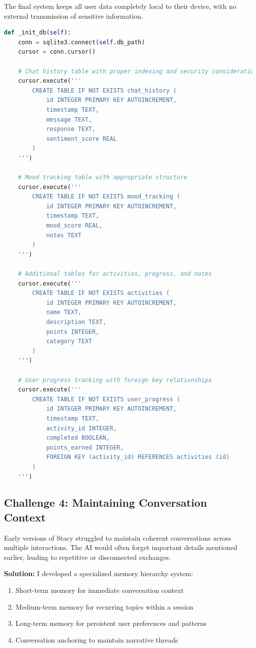 \documentclass[12pt]{article}
\begin{document}
The final system keeps all user data completely local to their device, with no external transmission of sensitive information.

\begin{lstlisting}[language=Python, caption=Secure Database Implementation]
def _init_db(self):
    conn = sqlite3.connect(self.db_path)
    cursor = conn.cursor()
    
    # Chat history table with proper indexing and security considerations
    cursor.execute('''
        CREATE TABLE IF NOT EXISTS chat_history (
            id INTEGER PRIMARY KEY AUTOINCREMENT,
            timestamp TEXT,
            message TEXT,
            response TEXT,
            sentiment_score REAL
        )
    ''')
    
    # Mood tracking table with appropriate structure
    cursor.execute('''
        CREATE TABLE IF NOT EXISTS mood_tracking (
            id INTEGER PRIMARY KEY AUTOINCREMENT,
            timestamp TEXT,
            mood_score REAL,
            notes TEXT
        )
    ''')
    
    # Additional tables for activities, progress, and notes
    cursor.execute('''
        CREATE TABLE IF NOT EXISTS activities (
            id INTEGER PRIMARY KEY AUTOINCREMENT,
            name TEXT,
            description TEXT,
            points INTEGER,
            category TEXT
        )
    ''')
    
    # User progress tracking with foreign key relationships
    cursor.execute('''
        CREATE TABLE IF NOT EXISTS user_progress (
            id INTEGER PRIMARY KEY AUTOINCREMENT,
            timestamp TEXT,
            activity_id INTEGER,
            completed BOOLEAN,
            points_earned INTEGER,
            FOREIGN KEY (activity_id) REFERENCES activities (id)
        )
    ''')
\end{lstlisting}

\subsection{Challenge 4: Maintaining Conversation Context}

Early versions of Stacy struggled to maintain coherent conversations across multiple interactions. The AI would often forget important details mentioned earlier, leading to repetitive or disconnected exchanges.

\textbf{Solution:} I developed a specialized memory hierarchy system:

\begin{enumerate}
    \item Short-term memory for immediate conversation context
    \item Medium-term memory for recurring topics within a session
    \item Long-term memory for persistent user preferences and patterns
    \item Conversation anchoring to maintain narrative threads
\end{enumerate}
\end{document}
